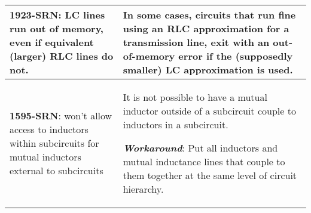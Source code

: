 {\begin{longtable}[h] {>{\raggedright\small}m{2in}|>{\raggedright\let\\\tabularnewline\small}m{3.5in}}
\textbf{1923-SRN}: LC lines run out of memory, even if equivalent (larger) RLC
lines do not. &  In some cases, circuits that run fine using an RLC approximation for a
transmission line, exit with an out-of-memory error if the (supposedly smaller) LC
approximation is used.
\\ \hline

\textbf{1595-SRN}: \Xyce{} won't allow access to inductors within subcircuits for
mutual inductors external to subcircuits & It is not possible to have a mutual
inductor outside of a subcircuit couple to inductors in a subcircuit.

\textbf{\textit{Workaround}}: Put all inductors and mutual inductance lines that couple to
them together at the same level of circuit hierarchy.
\\ \hline


\end{longtable}
}
